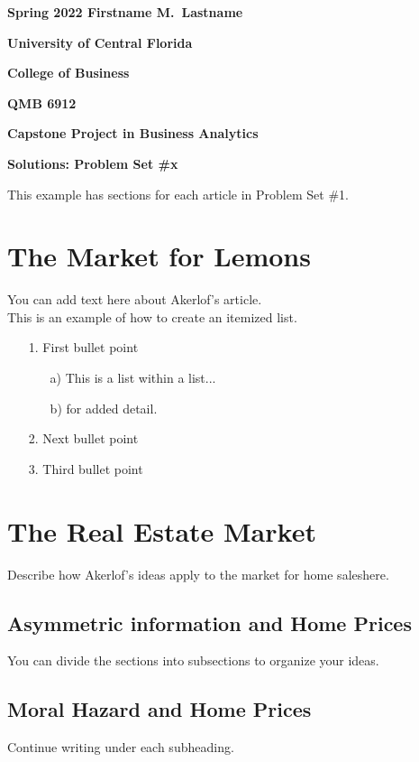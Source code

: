 \documentclass[11pt]{book}
\begin{document}
\pagestyle{empty}
{\noindent\bf Spring 2022 \hfill Firstname M.~Lastname}
\vskip 16pt
\centerline{\bf University of Central Florida}
\centerline{\bf College of Business}
\vskip 16pt
\centerline{\bf QMB 6912}
\centerline{\bf Capstone Project in Business Analytics}
\vskip 10pt
\centerline{\bf Solutions:  Problem Set \#x}
\vskip 32pt

This example has sections for each article in Problem Set \#1.

\section{The Market for Lemons}


\noindent You can add text here about Akerlof's article. \\

This is an example of how to create an itemized list.

\begin{itemize}
\item[1.] First bullet point
	
	\begin{itemize}
	\item[a)] This is a list within a list...
	
	\item[b)] for added detail.
	\end{itemize}
	
\item[2.] Next bullet point
\item[3.] Third bullet point

\end{itemize}

\section{The Real Estate Market}

Describe how Akerlof's ideas apply to the market for home saleshere.


\subsection{Asymmetric information and Home Prices}

You can divide the sections into subsections to organize your ideas. 

\subsection{Moral Hazard and Home Prices}

Continue writing under each subheading.
\end{document}
